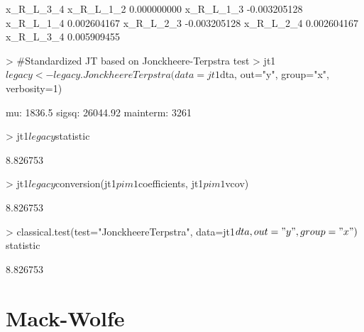 \documentclass[12pt]{article}
\begin{document}
\begin{Schunk}
\begin{Soutput}
             x_R_L_3_4
x_R_L_1_2  0.000000000
x_R_L_1_3 -0.003205128
x_R_L_1_4  0.002604167
x_R_L_2_3 -0.003205128
x_R_L_2_4  0.002604167
x_R_L_3_4  0.005909455
\end{Soutput}
\begin{Sinput}
> 	#Standardized JT based on Jonckheere-Terpstra test
> 	jt1$legacy<-legacy.JonckheereTerpstra(data=jt1$dta, out="y", group="x", verbosity=1) 
\end{Sinput}
\begin{Soutput}
mu: 1836.5 
sigsq: 26044.92 
mainterm: 3261 
\end{Soutput}
\begin{Sinput}
> 	jt1$legacy$statistic
\end{Sinput}
\begin{Soutput}
[1] 8.826753
\end{Soutput}
\begin{Sinput}
> 	jt1$legacy$conversion(jt1$pim1$coefficients, jt1$pim1$vcov)
\end{Sinput}
\begin{Soutput}
         [,1]
[1,] 8.826753
\end{Soutput}
\begin{Sinput}
> 	classical.test(test="JonckheereTerpstra", data=jt1$dta, out="y", group="x")$statistic
\end{Sinput}
\begin{Soutput}
         [,1]
[1,] 8.826753
\end{Soutput}
\end{Schunk}

\section{Mack-Wolfe}\label{S_MW}
\end{document}
